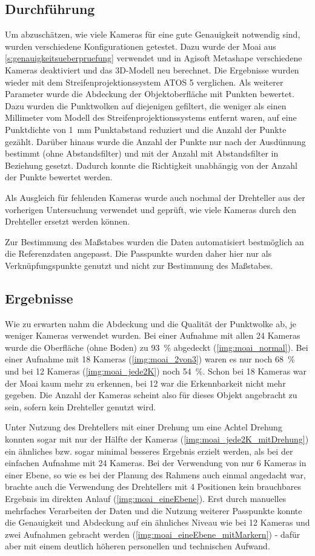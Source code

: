 \documentclass[./00PhotoBox.tex]{subfiles}
\begin{document}
\subsection{Durchführung}
Um abzuschätzen, wie viele Kameras für eine gute Genauigkeit notwendig sind, wurden verschiedene Konfigurationen getestet. Dazu wurde der Moai aus \autoref{s:genauigkeitsueberpruefung} verwendet und in Agisoft Metashape verschiedene Kameras deaktiviert und das 3D-Modell neu berechnet. Die Ergebnisse wurden wieder mit dem Streifenprojektionssystem ATOS 5 verglichen. Als weiterer Parameter wurde die Abdeckung der Objektoberfläche mit Punkten bewertet. Dazu wurden die Punktwolken auf diejenigen gefiltert, die weniger als einen Millimeter vom Modell des Streifenprojektionssystems entfernt waren, auf eine Punktdichte von 1~mm Punktabstand reduziert und die Anzahl der Punkte gezählt. Darüber hinaus wurde die Anzahl der Punkte nur nach der Ausdünnung bestimmt (ohne Abstandsfilter) und mit der Anzahl mit Abstandsfilter in Beziehung gesetzt. Dadurch konnte  die Richtigkeit unabhängig von der Anzahl der Punkte bewertet werden.

Als Ausgleich für fehlenden Kameras wurde auch nochmal der Drehteller aus der vorherigen Untersuchung verwendet und geprüft, wie viele Kameras durch den Drehteller ersetzt werden können.

Zur Bestimmung des Maßstabes wurden die Daten automatisiert bestmöglich an die Referenzdaten angepasst. Die Passpunkte wurden daher hier nur als Verknüpfungspunkte genutzt und nicht zur Bestimmung des Maßstabes.

\subsection{Ergebnisse}
Wie zu erwarten nahm die Abdeckung und die Qualität der Punktwolke ab, je weniger Kameras verwendet wurden. Bei einer Aufnahme mit allen 24 Kameras wurde die Oberfläche (ohne Boden) zu 93~\% abgedeckt (\autoref{img:moai_normal}). Bei einer Aufnahme mit 18 Kameras (\autoref{img:moai_2von3}) waren es nur noch 68~\% und bei 12 Kameras (\autoref{img:moai_jede2K}) noch 54~\%.  Schon bei 18 Kameras war der Moai kaum mehr zu erkennen, bei 12 war die Erkennbarkeit nicht mehr gegeben. Die Anzahl der Kameras scheint also für dieses Objekt angebracht zu sein, sofern kein Drehteller genutzt wird.

Unter Nutzung des Drehtellers mit einer Drehung um eine Achtel Drehung konnten sogar mit nur der Hälfte der Kameras (\autoref{img:moai_jede2K_mitDrehung}) ein ähnliches bzw. sogar minimal besseres Ergebnis erzielt werden, als bei der einfachen Aufnahme mit 24 Kameras. Bei der Verwendung von nur 6 Kameras in einer Ebene, so wie es bei der Planung des Rahmens auch einmal angedacht war, brachte auch die Verwendung des Drehtellers mit 4 Positionen kein brauchbares Ergebnis im direkten Anlauf (\autoref{img:moai_eineEbene}). Erst durch manuelles mehrfaches Verarbeiten der Daten und die Nutzung weiterer Passpunkte konnte die Genauigkeit und Abdeckung auf ein ähnliches Niveau wie bei 12 Kameras und zwei Aufnahmen gebracht werden (\autoref{img:moai_eineEbene_mitMarkern}) - dafür aber mit einem deutlich höheren personellen und technischen Aufwand.
\end{document}
